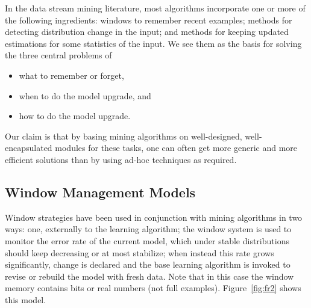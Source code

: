 




\label{Sframework}

In the data stream mining literature, %
most algorithms incorporate one or more of the following ingredients: 
windows to remember recent examples; methods for detecting distribution change in the input; 
and methods for keeping updated estimations for some statistics of the input. 
We see them as the basis for solving the three central problems of

\begin{itemize}
 \item  what to remember or forget,
 \item  when to do the model upgrade, and  
 \item  how to do the model upgrade.
\end{itemize}

Our claim is that by basing mining algorithms on well-designed, well-encap\-sulated
modules for these tasks, one can often get more generic and more efficient solutions
than by using ad-hoc techniques as required.  



\subsection{Window Management Models}%
Window strategies have been used in conjunction
with %
mining algorithms in two ways: one,
externally to the learning algorithm; the window system %
is used to monitor the error rate of the current model, which under
stable distributions should keep decreasing or at most stabilize;
when instead this rate grows significantly, change is declared and
the base learning algorithm is invoked to revise or rebuild the
model with fresh data. Note that in this case the window memory
contains bits or real numbers (not full examples).
Figure~\ref{fig:fr2} shows this model. 


